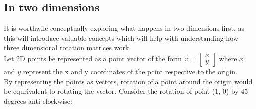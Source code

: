 \documentclass[12pt, a4paper]{article}
\begin{document}
\subsection{In two dimensions}
It is worthwile conceptually exploring what happens in two dimensions first, as
this will introduce valuable concepts which will help with understanding how
three dimensional rotation matrices work. \\

Let 2D points be represented as a point vector of the form $\vec{v} =
        \begin{bmatrix}x \\ y\end{bmatrix}$ where $x$ and $y$ represent the x
        and y coordinates of the point respective to the origin. \\

By representing the points as vectors, rotation of a point around the origin
would be equrivalent to rotating the vector. Consider the rotation of point (1,
0) by 45 degrees anti-clockwise:
\end{document}

